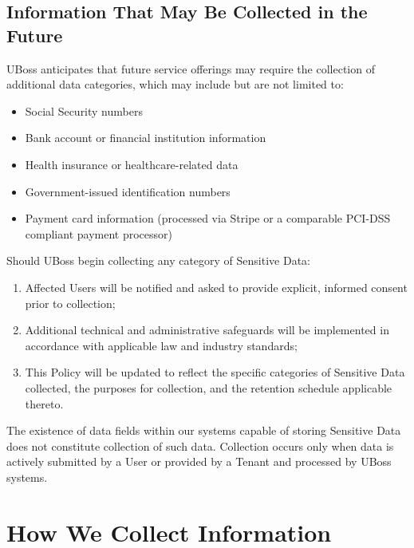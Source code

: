 \documentclass[11pt, letterpaper]{article}
\begin{document}
\subsection{Information That May Be Collected in the Future}

UBoss anticipates that future service offerings may require the collection of additional
data categories, which may include but are not limited to:

\begin{itemize}
    \item Social Security numbers
    \item Bank account or financial institution information
    \item Health insurance or healthcare-related data
    \item Government-issued identification numbers
    \item Payment card information (processed via Stripe or a comparable PCI-DSS compliant
          payment processor)
\end{itemize}

\begin{tcolorbox}[keywarning, title={Important}]
Should UBoss begin collecting any category of Sensitive Data:
\begin{enumerate}
    \item Affected Users will be notified and asked to provide explicit, informed consent
          prior to collection;
    \item Additional technical and administrative safeguards will be implemented in
          accordance with applicable law and industry standards;
    \item This Policy will be updated to reflect the specific categories of Sensitive Data
          collected, the purposes for collection, and the retention schedule applicable
          thereto.
\end{enumerate}
The existence of data fields within our systems capable of storing Sensitive Data does
not constitute collection of such data. Collection occurs only when data is actively
submitted by a User or provided by a Tenant and processed by UBoss systems.
\end{tcolorbox}

\section{How We Collect Information}
\end{document}
